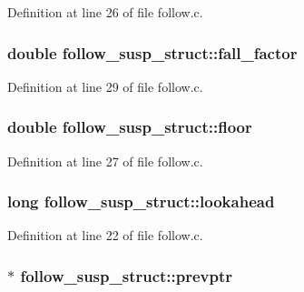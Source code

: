 Definition at line 26 of file follow.\+c.

\subsubsection[{\texorpdfstring{fall\+\_\+factor}{fall_factor}}]{\setlength{\rightskip}{0pt plus 5cm}double follow\+\_\+susp\+\_\+struct\+::fall\+\_\+factor}\hypertarget{structfollow__susp__struct_a82bfa1dafe6ee3f812a5eb7095650eae}{}\label{structfollow__susp__struct_a82bfa1dafe6ee3f812a5eb7095650eae}


Definition at line 29 of file follow.\+c.

\subsubsection[{\texorpdfstring{floor}{floor}}]{\setlength{\rightskip}{0pt plus 5cm}double follow\+\_\+susp\+\_\+struct\+::floor}\hypertarget{structfollow__susp__struct_af87c139a37c84d9032dfe5c14d902b27}{}\label{structfollow__susp__struct_af87c139a37c84d9032dfe5c14d902b27}


Definition at line 27 of file follow.\+c.

\subsubsection[{\texorpdfstring{lookahead}{lookahead}}]{\setlength{\rightskip}{0pt plus 5cm}long follow\+\_\+susp\+\_\+struct\+::lookahead}\hypertarget{structfollow__susp__struct_acb8ad8c0ca23df686025ce4b87171f6f}{}\label{structfollow__susp__struct_acb8ad8c0ca23df686025ce4b87171f6f}


Definition at line 22 of file follow.\+c.

\subsubsection[{\texorpdfstring{prevptr}{prevptr}}]{$\ast$ follow\+\_\+susp\+\_\+struct\+::prevptr}\hypertarget{structfollow__susp__struct_a563cae310bbd66e2d4d43e9cc0b40cd0}{}\label{structfollow__susp__struct_a563cae310bbd66e2d4d43e9cc0b40cd0}


